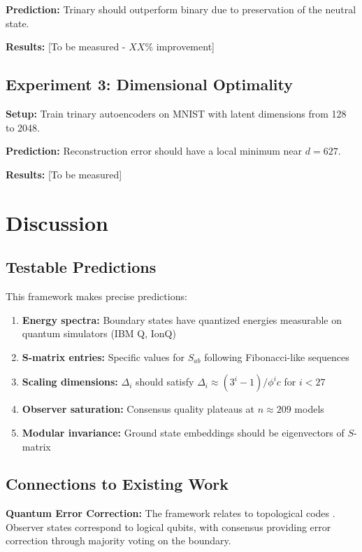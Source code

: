 \documentclass[11pt]{article}
\begin{document}
\textbf{Prediction:} Trinary should outperform binary due to preservation of the neutral state.

\textbf{Results:} [To be measured - $XX\%$ improvement]

\subsection{Experiment 3: Dimensional Optimality}

\textbf{Setup:} Train trinary autoencoders on MNIST with latent dimensions from 128 to 2048.

\textbf{Prediction:} Reconstruction error should have a local minimum near $d = 627$.

\textbf{Results:} [To be measured]

\section{Discussion}

\subsection{Testable Predictions}

This framework makes precise predictions:
\begin{enumerate}
\item \textbf{Energy spectra:} Boundary states have quantized energies measurable on quantum simulators (IBM Q, IonQ)
\item \textbf{S-matrix entries:} Specific values for $S_{ab}$ following Fibonacci-like sequences
\item \textbf{Scaling dimensions:} $\Delta_i$ should satisfy $\Delta_i \approx (3^i - 1)/\phi^i c$ for $i < 27$
\item \textbf{Observer saturation:} Consensus quality plateaus at $n \approx 209$ models
\item \textbf{Modular invariance:} Ground state embeddings should be eigenvectors of $S$-matrix
\end{enumerate}

\subsection{Connections to Existing Work}

\textbf{Quantum Error Correction:} The framework relates to topological codes \cite{kitaev2003}. Observer states correspond to logical qubits, with consensus providing error correction through majority voting on the boundary.
\end{document}
